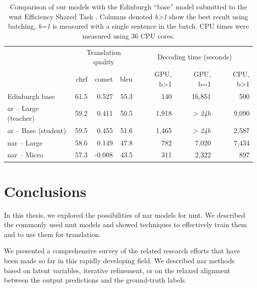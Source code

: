 \begin{table}
  \centering

  \begin{tabular}{lrrrrrr}
    \toprule
    & \multicolumn{3}{c}{Translation quality} & \multicolumn{3}{c}{Decoding time (seconds)} \\
    & {\small \acs{chrf}} & {\small \acs{comet}} & {\small \acs{bleu}} & {\small GPU, b>1} & {\small GPU, b=1} & {\small CPU, b>1} \\
    \midrule
    Edinburgh base & 61.5 & 0.527 & 55.3 & 140 & 16,851 & 500 \\
    \midrule
    \acs{ar} -- Large (teacher) & 59.2 & 0.411 & 50.5 & 1,918 & {\it > 24h} & 9,090 \\
    \acs{ar} -- Base (student) & 59.5 & 0.455 & 51.6 & 1,465 & {\it > 24h} & 2,587 \\
    \addlinespace
    \acs{nar} -- Large & 58.6 & 0.149 & 47.8 & 782 & 7,020 & 7,434 \\
    \acs{nar} -- Micro & 57.3 & -0.008 & 43.5 & 311 & 2,322 & 897 \\
    \bottomrule
  \end{tabular}

  \caption{Comparison of our models with the Edinburgh ``base'' model submitted
    to the \acs{wmt} Efficiency Shared Task \citep{Behnke-wmt21-speed}. Columns
    denoted \emph{b>1} show the best result using batching, \emph{b=1} is
    measured with a single sentence in the batch. CPU times were measured using
    36 CPU cores.} %
  \label{tab:efficiency:comparison}
\end{table}

\chapter{Conclusions}


In this thesis, we explored the possibilities of \ac{nar} models for
\ac{nmt}. We described the commonly used \ac{nmt} models and showed techniques
to effectively train them and to use them for translation.

We presented a comprehensive survey of the related research efforts that have
been made so far in this rapidly developing field. We described \ac{nar}
methods based on latent variables, iterative refinement, or on the relaxed
alignment between the output predictions and the ground-truth labels.

